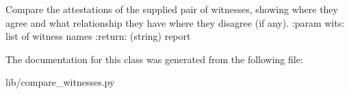\begin{DoxyVerb}Compare the attestations of the supplied pair of witnesses, showing where they agree and what relationship
they have where they disagree (if any).
:param wits: list of witness names
:return: (string) report
\end{DoxyVerb}
 

The documentation for this class was generated from the following file\+:\begin{DoxyCompactItemize}
\item 
lib/compare\+\_\+witnesses.\+py\end{DoxyCompactItemize}
